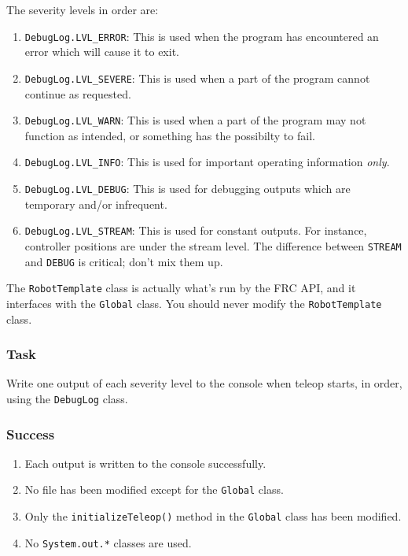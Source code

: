 \documentclass[a4paper]{article}
\begin{document}
The severity levels in order are:

\begin{enumerate}\item{\lstinline{DebugLog.LVL_ERROR}: This is used when the program has encountered an error which will cause it to exit.}\item{\lstinline{DebugLog.LVL_SEVERE}: This is used when a part of the program cannot continue as requested.}\item{\lstinline{DebugLog.LVL_WARN}: This is used when a part of the program may not function as intended, or something has the possibilty to fail.}\item{\lstinline{DebugLog.LVL_INFO}: This is used for important operating information \textit{only}.}\item{\lstinline{DebugLog.LVL_DEBUG}: This is used for debugging outputs which are temporary and/or infrequent.}\item{\lstinline{DebugLog.LVL_STREAM}: This is used for constant outputs. For instance, controller positions are under the stream level. The difference between \lstinline{STREAM} and \lstinline{DEBUG} is critical; don't mix them up.}\end{enumerate}

The \lstinline{RobotTemplate} class is actually what's run by the FRC API, and it interfaces with the \lstinline{Global} class. You should never modify the \lstinline{RobotTemplate} class.

\subsubsection{Task} Write one output of each severity level to the console when teleop starts, in order, using the \lstinline{DebugLog} class.
\subsubsection{Success} \begin{enumerate}\item{Each output is written to the console successfully.}\item{No file has been modified except for the \lstinline{Global} class.}\item{Only the \lstinline{initializeTeleop()} method in the \lstinline{Global} class has been modified.}\item{No \lstinline{System.out.*} classes are used.}\end{enumerate}
\end{document}

